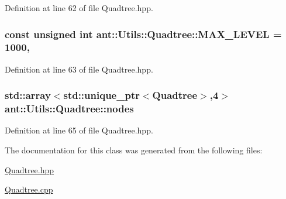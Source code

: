 Definition at line 62 of file Quadtree.\+hpp.

\hypertarget{classant_1_1_utils_1_1_quadtree_a5c8873d75fa20002086f506ecfcf8354}{
\subsubsection[{M\+A\+X\+\_\+\+L\+E\+V\+E\+L}]{\setlength{\rightskip}{0pt plus 5cm}const unsigned int ant\+::\+Utils\+::\+Quadtree\+::\+M\+A\+X\+\_\+\+L\+E\+V\+E\+L = 1000\hspace{0.3cm}{\ttfamily [static]}, {\ttfamily [private]}}}\label{classant_1_1_utils_1_1_quadtree_a5c8873d75fa20002086f506ecfcf8354}


Definition at line 63 of file Quadtree.\+hpp.

\hypertarget{classant_1_1_utils_1_1_quadtree_a188cbcea719019bfefe8adb050a51718}{
\subsubsection[{nodes}]{\setlength{\rightskip}{0pt plus 5cm}std\+::array$<$std\+::unique\+\_\+ptr$<${\bf Quadtree}$>$,4$>$ ant\+::\+Utils\+::\+Quadtree\+::nodes\hspace{0.3cm}{\ttfamily [private]}}}\label{classant_1_1_utils_1_1_quadtree_a188cbcea719019bfefe8adb050a51718}


Definition at line 65 of file Quadtree.\+hpp.



The documentation for this class was generated from the following files\+:\begin{DoxyCompactItemize}
\item 
\hyperlink{_quadtree_8hpp}{Quadtree.\+hpp}\item 
\hyperlink{_quadtree_8cpp}{Quadtree.\+cpp}\end{DoxyCompactItemize}
